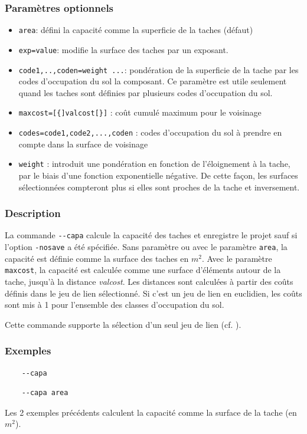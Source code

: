 \documentclass[a4paper,10pt]{report}
\begin{document}
\subsubsection{Paramètres optionnels}
\begin{itemize}
	\item \verb|area|: défini la capacité comme la superficie de la taches (défaut)
	\item \verb|exp=value|: modifie la surface des taches par un exposant.
	\item \verb|code1,..,coden=weight ...|: pondération de la superficie de la tache par les codes d'occupation du sol la composant. Ce paramètre est utile seulement quand les taches sont définies par plusieurs codes d'occupation du sol.
	\item \verb|maxcost=[{]valcost[}]| : coût cumulé maximum pour le voisinage
	\item \verb|codes=code1,code2,...,coden| : codes d'occupation du sol à prendre en compte dans la surface de voisinage
	\item \verb|weight| : introduit une pondération en fonction de l’éloignement à la tache, par le biais d’une fonction exponentielle négative. De cette façon, les surfaces sélectionnées compteront plus si elles sont proches de la tache et inversement.
\end{itemize}

\subsubsection{Description}
La commande \verb|--capa| calcule la capacité des taches et enregistre le projet sauf si l'option \verb|-nosave| a été spécifiée. Sans paramètre ou avec le paramètre \verb|area|, la capacité est définie comme la surface des taches en $m^2$. Avec le paramètre \verb|maxcost|, la capacité est calculée comme une surface d'éléments autour de la tache, jusqu'à la distance \textit{valcost}.
Les distances sont calculées à partir des coûts définis dans le jeu de lien sélectionné. Si c'est un jeu de lien en euclidien, les coûts sont mis à 1 pour l'ensemble des classes d'occupation du sol.

Cette commande supporte la sélection d'un seul jeu de lien (cf. ).

\subsubsection{Exemples}
\begin{Verbatim}
	--capa
\end{Verbatim}
\begin{Verbatim}
	--capa area
\end{Verbatim}
Les 2 exemples précédents calculent la capacité comme la surface de la tache (en $m^2$).
\end{document}
